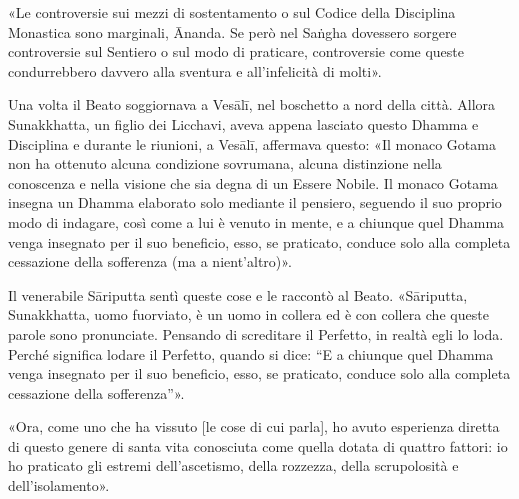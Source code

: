 «Le controversie sui mezzi di sostentamento o sul Codice della
Disciplina Monastica sono marginali, Ānanda. Se però nel Saṅgha
dovessero sorgere controversie sul Sentiero o sul modo di praticare,
controversie come queste condurrebbero davvero alla sventura e
all’infelicità di molti».




Una volta il Beato soggiornava a Vesālī, nel boschetto a nord della
città. Allora Sunakkhatta, un figlio dei Licchavi, aveva appena lasciato
questo Dhamma e Disciplina e durante le riunioni, a Vesālī, affermava
questo: «Il monaco Gotama non ha ottenuto alcuna condizione sovrumana,
alcuna distinzione nella conoscenza e nella visione che sia degna di un
Essere Nobile. Il monaco Gotama insegna un Dhamma elaborato solo
mediante il pensiero, seguendo il suo proprio modo di indagare, così
come a lui è venuto in mente, e a chiunque quel Dhamma venga insegnato
per il suo beneficio, esso, se praticato, conduce solo alla completa
cessazione della sofferenza (ma a nient’altro)».


Il venerabile Sāriputta sentì queste cose e le raccontò al Beato.
«Sāriputta, Sunakkhatta, uomo fuorviato, è un uomo in collera ed è con
collera che queste parole sono pronunciate. Pensando di screditare il
Perfetto, in realtà egli lo loda. Perché significa lodare il Perfetto,
quando si dice: “E a chiunque quel Dhamma venga insegnato per il suo
beneficio, esso, se praticato, conduce solo alla completa cessazione
della sofferenza”».


«Ora, come uno che ha vissuto [le cose di cui parla], ho avuto
esperienza diretta di questo genere di santa vita conosciuta come quella
dotata di quattro fattori: io ho praticato gli estremi dell’ascetismo,
della rozzezza, della scrupolosità e dell’isolamento».


